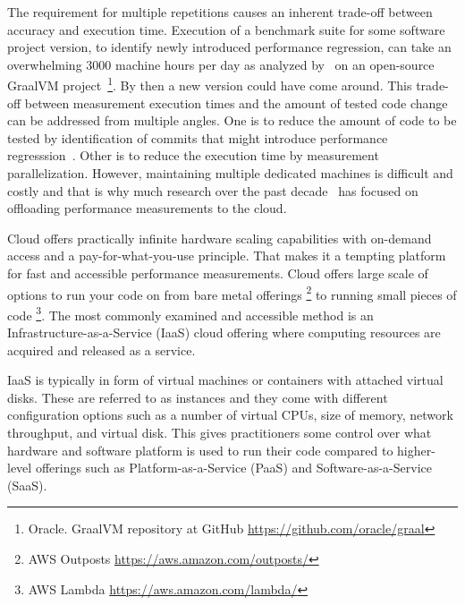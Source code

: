 The requirement for multiple repetitions causes an inherent trade-off between accuracy and execution time.
Execution of a benchmark suite for some software project version, to identify newly introduced performance regression, can take an overwhelming 3000 machine hours per day as analyzed by~\citet{bulej2020duet} on an open-source GraalVM project~\footnote{Oracle. GraalVM repository at GitHub \url{https://github.com/oracle/graal}}.
By then a new version could have come around.
This trade-off between measurement execution times and the amount of tested code change can be addressed from multiple angles.
One is to reduce the amount of code to be tested by identification of commits that might introduce performance regresssion~\citet{oliveira2017perphecy}.
Other is to reduce the execution time by measurement parallelization.
However, maintaining multiple dedicated machines is difficult and costly  and that is why much research over the past decade~\cite{leitner2016patterns, laaber2019software, abedi2017conducting} has focused on offloading performance measurements to the cloud.

Cloud offers practically infinite hardware scaling capabilities with on-demand access and a pay-for-what-you-use principle.
That makes it a tempting platform for fast and accessible performance measurements.
Cloud offers large scale of options to run your code on from bare metal offerings \footnote{AWS Outposts \url{https://aws.amazon.com/outposts/}} to running small pieces of code \footnote{AWS Lambda \url{https://aws.amazon.com/lambda/}}.
The most commonly examined and accessible method is an Infrastructure-as-a-Service (IaaS) cloud offering where computing resources are acquired and released as a service.

IaaS is typically in form of virtual machines or containers with attached virtual disks.
These are referred to as instances and they come with different configuration options such as a number of virtual CPUs, size of memory, network throughput, and virtual disk.
This gives practitioners some control over what hardware and software platform is used to run their code compared to higher-level offerings such as Platform-as-a-Service (PaaS) and Software-as-a-Service (SaaS).

